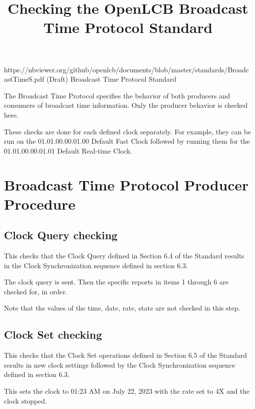 

\title{Checking the OpenLCB Broadcast Time Protocol Standard}


\maketitle


\introductionCaveats
    {https://nbviewer.org/github/openlcb/documents/blob/master/standards/BroadcastTimeS.pdf}
    {(Draft) Broadcast Time Protocol Standard}

The Broadcast Time Protocol specifies the behavior of both producers and consumers of 
broadcast time information.  Only the producer behavior is checked here.

These checks are done for each defined clock separately. 
For example, they can be run on the 01.01.00.00.01.00 Default Fast Clock
followed by running them for the 01.01.00.00.01.01 Default Real-time Clock.

\section{Broadcast Time Protocol Producer Procedure}


\subsection{Clock Query checking}

This checks that the Clock Query defined in Section 6.4 of the Standard results in the
Clock Synchronization sequence defined in section 6.3.

The clock query is sent. 
Then the specific reports in items 1 through 6 are checked for, in order.

Note that the values of the time, date, rate, state are not checked in this step.

\subsection{Clock Set checking}

This checks that the Clock Set operations defined in Section 6.5 of the Standard results 
in new clock settings followed by the
Clock Synchronization sequence defined in section 6.3.

This sets the clock to 01:23 AM on July 22, 2023 with the rate set to 4X and the clock stopped.

